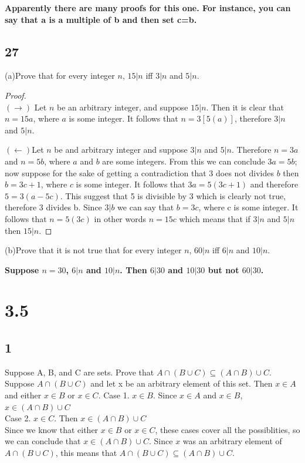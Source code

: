 \documentclass{article}
\begin{document}
\textbf{Apparently there are many proofs for this one. For instance, you can say that a is a multiple of b and then set c=b.}
\subsection{27}
(a)Prove that for every integer $n$, $15|n$ iff $3|n$ and $5|n$.
\begin{proof}$ $ \\
$(\rightarrow)$ Let $n$ be an arbitrary integer, and suppose $15|n$. Then it is clear that $n=15a$, where $a$ is some integer. It follows that $n=3[5(a)]$, therefore $3|n$ and $5|n$.

$ $\\
$(\leftarrow)$Let $n$ be and arbitrary integer and suppose $3|n$ and $5|n$. Therefore $n=3a$ and $n=5b$, where $a$ and $b$ are some integers. From this we can conclude $3a=5b$; now suppose for the sake of getting a contradiction that 3 does not divides $b$ then $b=3c+1$, where $c$ is some integer. It follows that $3a=5(3c+1)$ and therefore $5=3(a-5c)$. This suggest that 5 is divisible by 3 which is clearly not true, therefore 3 divides b. Since $3|b$ we can say that $b=3c$, where c is some integer. It follows that $n=5(3c)$ in other words $n=15c$ which means that if $3|n$ and $5|n$ then $15|n$.
\end{proof}

(b)Prove that it is not true that for every integer $n$, $60|n$ iff $6|n$ and $10|n$.

\textbf{Suppose $n=30$, $6|n$ and $10|n$. Then $6|30$ and $10|30$ but not $60|30$. }

\section{3.5}
\subsection{1}
Suppose A, B, and C are sets. Prove that $A \cap (B \cup C) \subseteq (A \cap B)\cup C$. $ $
 \\
Suppose $A\cap (B \cup C)$ and let x be an arbitrary element of this set. Then $x\in A$ and either $x \in B $ or $x \in C $.
Case 1. $x \in B$. Since $x \in A $ and $x \in B$, $x \in (A \cap B) \cup C$ $ $\\
Case 2. $x \in C$. Then $x \in (A \cap B) \cup C$ $ $\\
Since we know that either $x \in B $ or $x \in C$, these cases cover all the possiblities, so we can conclude that $x \in (A \cap B ) \cup C$. Since $x$ was an arbitrary element of $A \cap (B \cup C)$, this means that $A\cap (B \cup C) \subseteq (A \cap B) \cup C$.
\end{document}
